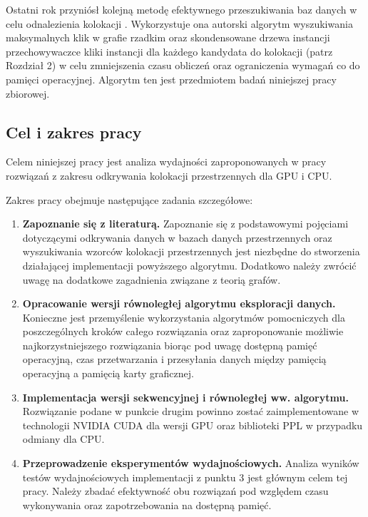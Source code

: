 \documentclass[12pt]{article}
\begin{document}
Ostatni rok przyniósł kolejną metodę efektywnego przeszukiwania baz danych w celu odnalezienia kolokacji \cite{chinczyki}. Wykorzystuje ona autorski algorytm wyszukiwania maksymalnych klik w grafie rzadkim oraz skondensowane drzewa instancji przechowywaczce kliki instancji dla każdego kandydata do kolokacji (patrz Rozdział 2) w celu zmniejszenia czasu obliczeń oraz ograniczenia wymagań co do pamięci operacyjnej. Algorytm ten jest przedmiotem badań niniejszej pracy zbiorowej.

\subsection{Cel i zakres pracy}

Celem niniejszej pracy jest analiza wydajności zaproponowanych w pracy \cite{chinczyki} rozwiązań z zakresu odkrywania kolokacji przestrzennych dla GPU i CPU.

Zakres pracy obejmuje następujące zadania szczegółowe:

\begin{enumerate}
\item \textbf{Zapoznanie się z literaturą.} Zapoznanie się z podstawowymi pojęciami dotyczącymi odkrywania danych w bazach danych przestrzennych oraz wyszukiwania wzorców kolokacji przestrzennych jest niezbędne do stworzenia działającej implementacji powyższego algorytmu. Dodatkowo należy zwrócić uwagę na dodatkowe zagadnienia związane z teorią grafów.
\item \textbf{Opracowanie wersji równoległej algorytmu eksploracji danych.} Konieczne jest przemyślenie wykorzystania algorytmów pomocniczych dla poszczególnych kroków całego rozwiązania oraz zaproponowanie możliwie najkorzystniejszego rozwiązania biorąc pod uwagę dostępną pamięć operacyjną, czas przetwarzania i przesyłania danych między pamięcią operacyjną a pamięcią karty graficznej.
\item \textbf{Implementacja wersji sekwencyjnej i równoległej ww. algorytmu.} Rozwiązanie podane w punkcie drugim powinno zostać zaimplementowane w technologii NVIDIA CUDA dla wersji GPU oraz biblioteki PPL w przypadku odmiany dla CPU.
\item \textbf{Przeprowadzenie eksperymentów wydajnościowych.} Analiza wyników testów wydajnościowych implementacji z punktu 3 jest głównym celem tej pracy. Należy zbadać efektywność obu rozwiązań pod względem czasu wykonywania oraz zapotrzebowania na dostępną pamięć. 
\end{enumerate}
\end{document}
